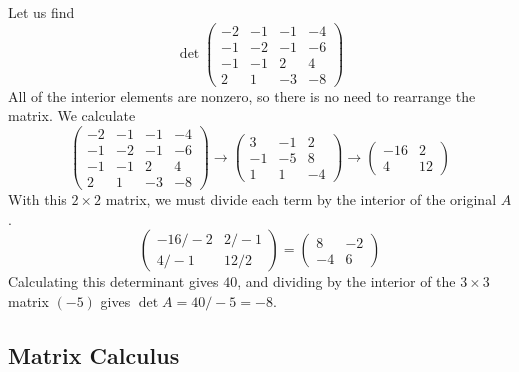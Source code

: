   \begin{example}
  Let us find
  \[\det{\begin{pmatrix}
  -2&-1&-1&-4\\-1&-2&-1&-6\\-1&-1&2&4\\2&1&-3&-8
  \end{pmatrix}}\]
  All of the interior elements are nonzero, so there is no need to rearrange the matrix. We calculate
  \[\begin{pmatrix}
  -2&-1&-1&-4\\-1&-2&-1&-6\\-1&-1&2&4\\2&1&-3&-8
  \end{pmatrix} \rightarrow \begin{pmatrix}
  3&-1&2\\-1&-5&8\\1&1&-4
  \end{pmatrix} \rightarrow \begin{pmatrix}
  -16&2\\4&12
  \end{pmatrix}\]
  With this $2 \times 2$ matrix, we must divide each term by the interior of the original $A$. 
  \[\begin{pmatrix}
  -16/-2 & 2/-1\\4/-1 & 12/2
  \end{pmatrix} = \begin{pmatrix}
  8&-2\\-4&6
  \end{pmatrix}\]
  Calculating this determinant gives $40$, and dividing by the interior of the $3 \times 3$ matrix $(-5)$ gives $\det{A} = 40/-5 = -8$. 
  \end{example}

\subsection{Matrix Calculus}

